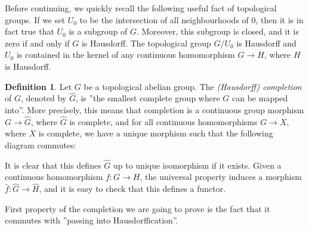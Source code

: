 \documentclass[12pt,a4paper,leqno]{article}
\theoremstyle{plain}
\theoremstyle{definition}
\newtheorem{defn}[theo]{Definition}
\theoremstyle{remark}
\begin{document}
Before continuing, we quickly recall the following useful fact of topological groups. If we set $U_0$ to be the intersection of all neighbourhoods of 0, then it is in fact true that $U_0$ is a subgroup of $G$. Moreover, this subgroup is closed, and it is zero if and only if $G$ is Hausdorff. The topological group $G / U_0$ is Hausdorff and $U_0$ is contained in the kernel of any continuous homomorphism $G \to H$, where $H$ is Hausdorff.

\begin{defn}
Let $G$ be a topological abelian group. The \emph{(Hausdorff) completion} of $G$, denoted by $\widehat G$, is ''the smallest complete group where $G$ can be mapped into''. More precisely, this means that completion is a continuous group morphism $G \to \widehat G$, where $\widehat G$ is complete, and for all continuous homomorphisms $G \to X$, where $X$ is complete, we have a unique morphism such that the following diagram commutes:

\begin{center}
\end{center}
It is clear that this defines $\widehat G$ up to unique isomorphism if it exists. Given a continuous homomorphism $f: G \to H$, the universal property induces a morphism $\widehat f : \widehat G \to \widehat H$, and it is easy to check that this defines a functor.
\end{defn}

First property of the completion we are going to prove is the fact that it commutes with ''passing into Hausdorffication''.
\end{document}
